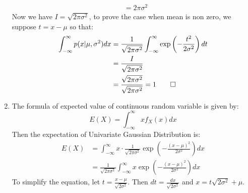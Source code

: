 \documentclass[a4paper, 10pt]{article}  %
\begin{document}
\begin{enumerate}[label=\textbf{(\alph*)}]
\begin{align*}
        &= 2 \pi \sigma^2
    \end{align*}
    Now we have $I = \sqrt{2 \pi \sigma^2}$, to prove the case when mean is non zero, we suppose $t = x - \mu$ so that:
    \begin{align*}
        \int_{-\infty}^\infty p(x|\mu, \sigma^2) dx &= \frac{1}{\sqrt{2 \pi \sigma^2}} \int_{-\infty}^\infty \exp \left( -\frac{t^2}{2\sigma^2} \right) dt \\
        &= \frac{I}{\sqrt{2 \pi \sigma^2}} \\
        &= \frac{\sqrt{2 \pi \sigma^2}}{\sqrt{2 \pi \sigma^2}} = 1  \qed
    \end{align*}
    
    \item The formula of expected value of continuous random variable is given by:
    \[ E(X) = \int_{-\infty}^\infty x f_X (x) dx\]
    Then the expectation of Univariate Gaussian Distribution is:
    \begin{align*}
        E(X) &= \int_{-\infty}^\infty x \cdot \frac{1}{\sqrt{2 \pi \sigma^2}} \exp \left(- \frac{(x- \mu)^2}{2 \sigma^2} \right) dx \\
        &= \frac{1}{\sqrt{2 \pi \sigma^2}} \int_{-\infty}^\infty x \exp \left(- \frac{(x- \mu)^2}{2 \sigma^2} \right) dx
    \end{align*}
    To simplify the equation, let \(\displaystyle{t = \frac{x - \mu}{\sqrt{2 \sigma^2}}}\). Then \(\displaystyle{dt = \frac{dx}{\sqrt{2 \sigma^2}}}\) and \(x = t\sqrt{2 \sigma^2} + \mu\). 
    

\end{enumerate}
\end{document}
